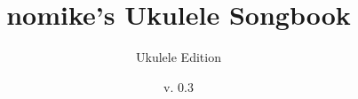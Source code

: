 \documentclass{article}
\newcommand{\titlepicture}[2][]{%
  \renewcommand\placetitlepicture{%
    \texttt{[image: \#2]}\par\medskip
  }%
}
\newcommand{\placetitlepicture}{} %
\begin{document}
\Huge
\title{nomike's Ukulele Songbook}
\author{Ukulele Edition}
\date{v. 0.3}
\titlepicture[width=6in]{ukulele}

\maketitle
\end{document}
